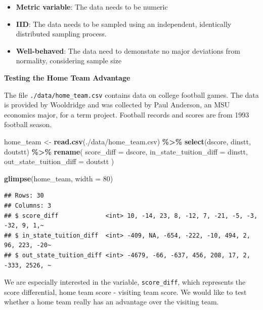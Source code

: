 \documentclass[
]{book}
\newenvironment{Shaded}{\begin{snugshade}}{\end{snugshade}}
\newcommand{\AttributeTok}[1]{\textcolor[rgb]{0.13,0.29,0.53}{#1}}
\newcommand{\DecValTok}[1]{\textcolor[rgb]{0.00,0.00,0.81}{#1}}
\newcommand{\FunctionTok}[1]{\textcolor[rgb]{0.13,0.29,0.53}{\textbf{#1}}}
\newcommand{\NormalTok}[1]{#1}
\newcommand{\OtherTok}[1]{\textcolor[rgb]{0.56,0.35,0.01}{#1}}
\newcommand{\SpecialCharTok}[1]{\textcolor[rgb]{0.81,0.36,0.00}{\textbf{#1}}}
\newcommand{\StringTok}[1]{\textcolor[rgb]{0.31,0.60,0.02}{#1}}
\providecommand{\tightlist}{%
  \setlength{\itemsep}{0pt}\setlength{\parskip}{0pt}}
\theoremstyle{definition}
\theoremstyle{definition}
\theoremstyle{definition}
\theoremstyle{definition}
\theoremstyle{remark}
\begin{document}
\begin{itemize}
\tightlist
\item
  \textbf{Metric variable}: The data needs to be numeric
\item
  \textbf{IID}: The data needs to be sampled using an independent, identically distributed sampling process.
\item
  \textbf{Well-behaved}: The data need to demonstate no major deviations from normality, considering sample size
\end{itemize}

\textbf{Testing the Home Team Advantage}

The file \texttt{./data/home\_team.csv} contains data on college football games. The data is provided by Wooldridge and was collected by Paul Anderson, an MSU economics major, for a term project. Football records and scores are from 1993 football season.

\begin{Shaded}
\begin{Highlighting}[]
\NormalTok{home\_team }\OtherTok{\textless{}{-}} \FunctionTok{read.csv}\NormalTok{(}\StringTok{\textquotesingle{}./data/home\_team.csv\textquotesingle{}}\NormalTok{) }\SpecialCharTok{\%\textgreater{}\%} 
  \FunctionTok{select}\NormalTok{(dscore, dinstt, doutstt) }\SpecialCharTok{\%\textgreater{}\%} 
  \FunctionTok{rename}\NormalTok{(}
    \AttributeTok{score\_diff               =}\NormalTok{ dscore, }
    \AttributeTok{in\_state\_tuition\_diff    =}\NormalTok{ dinstt, }
    \AttributeTok{out\_state\_tuition\_diff   =}\NormalTok{ doutstt}
\NormalTok{  )}

\FunctionTok{glimpse}\NormalTok{(home\_team, }\AttributeTok{width =} \DecValTok{80}\NormalTok{)}
\end{Highlighting}
\end{Shaded}

\begin{verbatim}
## Rows: 30
## Columns: 3
## $ score_diff             <int> 10, -14, 23, 8, -12, 7, -21, -5, -3, -32, 9, 1,~
## $ in_state_tuition_diff  <int> -409, NA, -654, -222, -10, 494, 2, 96, 223, -20~
## $ out_state_tuition_diff <int> -4679, -66, -637, 456, 208, 17, 2, -333, 2526, ~
\end{verbatim}

We are especially interested in the variable, \texttt{score\_diff}, which represents the score differential, home team score - visiting team score. We would like to test whether a home team really has an advantage over the visiting team.
\end{document}
